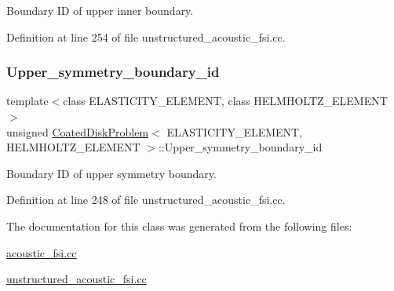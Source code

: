 Boundary ID of upper inner boundary. 



Definition at line 254 of file unstructured\+\_\+acoustic\+\_\+fsi.\+cc.

\mbox{\label{classCoatedDiskProblem_ab0fb6d4bdf876fb2df1f2fa05606526b}} 
\subsubsection{\texorpdfstring{Upper\+\_\+symmetry\+\_\+boundary\+\_\+id}{Upper\_symmetry\_boundary\_id}}
{\footnotesize\ttfamily template$<$class E\+L\+A\+S\+T\+I\+C\+I\+T\+Y\+\_\+\+E\+L\+E\+M\+E\+NT, class H\+E\+L\+M\+H\+O\+L\+T\+Z\+\_\+\+E\+L\+E\+M\+E\+NT$>$ \\
unsigned \hyperlink{classCoatedDiskProblem}{Coated\+Disk\+Problem}$<$ E\+L\+A\+S\+T\+I\+C\+I\+T\+Y\+\_\+\+E\+L\+E\+M\+E\+NT, H\+E\+L\+M\+H\+O\+L\+T\+Z\+\_\+\+E\+L\+E\+M\+E\+NT $>$\+::Upper\+\_\+symmetry\+\_\+boundary\+\_\+id\hspace{0.3cm}{\ttfamily [private]}}



Boundary ID of upper symmetry boundary. 



Definition at line 248 of file unstructured\+\_\+acoustic\+\_\+fsi.\+cc.



The documentation for this class was generated from the following files\+:\begin{DoxyCompactItemize}
\item 
\hyperlink{acoustic__fsi_8cc}{acoustic\+\_\+fsi.\+cc}\item 
\hyperlink{unstructured__acoustic__fsi_8cc}{unstructured\+\_\+acoustic\+\_\+fsi.\+cc}\end{DoxyCompactItemize}
